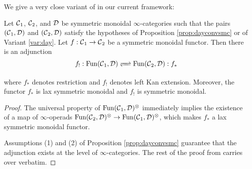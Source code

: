 We give a very close variant of \cite[Corollary 3.8]{Nikolaus} in our current framework:

\begin{prop}
Let $\operatorname{\mathcal{C}}_1$, $\operatorname{\mathcal{C}}_2$, and $\operatorname{\mathcal{D}}$ be symmetric monoidal $\infty$-categories such that the pairs $(\operatorname{\mathcal{C}}_1, \operatorname{\mathcal{D}})$ and $(\operatorname{\mathcal{C}}_2, \operatorname{\mathcal{D}})$ satisfy the hypotheses of Proposition \ref{prop:dayconvsmc} or of Variant \ref{var:day}.  Let $f:\operatorname{\mathcal{C}}_1 \to \operatorname{\mathcal{C}}_2$ be a symmetric monoidal functor.  Then there is an adjunction 
$$ f_! : \Fun(\C_1, \D) \xrightleftharpoons{\quad} \Fun(\C_2, \D): f_* $$ 

where $f_*$ denotes restriction and $f_!$ denotes left Kan extension.  Moreover, the functor $f_*$ is lax symmetric monoidal and $f_!$ is symmetric monoidal.  
\end{prop}
\begin{proof}
The universal property of $\operatorname{\text{Fun}}(\operatorname{\mathcal{C}}_1, \operatorname{\mathcal{D}})^{\otimes}$ immediately implies the existence of a map of $\infty$-operads $\operatorname{\text{Fun}}(\operatorname{\mathcal{C}}_2,\operatorname{\mathcal{D}})^{\otimes} \to \operatorname{\text{Fun}}(\operatorname{\mathcal{C}}_1,\operatorname{\mathcal{D}})^{\otimes}$, which makes $f_*$ a lax symmetric monoidal functor.  

Assumptions (1) and (2) of Proposition \ref{prop:dayconvsmc} guarantee that the adjunction exists at the level of $\infty$-categories.  The rest of the proof from \cite[Corollary 3.8]{Nikolaus} carries over verbatim.  
\end{proof}





